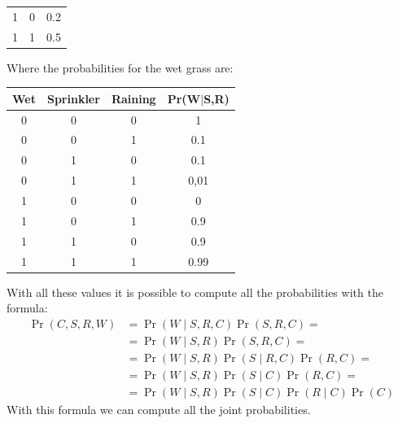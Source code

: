 \begin{example}
\begin{table}[H]
\begin{tabular}{ccc}
        1       & 0      & 0.2    \\
        1       & 1      & 0.5    \\ \hline
        \end{tabular}
    \end{table}
    Where the probabilities for the wet grass are: 
    \begin{table}[H]
        \centering
        \begin{tabular}{cccc}
        \hline
        \textbf{Wet} & \textbf{Sprinkler} & \textbf{Raining} & \textbf{Pr(W$\mid $S,R)} \\ \hline
        0            & 0                  & 0                & 1                   \\
        0            & 0                  & 1                & 0.1                 \\
        0            & 1                  & 0                & 0.1                 \\
        0            & 1                  & 1                & 0,01                \\
        1            & 0                  & 0                & 0                   \\
        1            & 0                  & 1                & 0.9                 \\
        1            & 1                  & 0                & 0.9                 \\
        1            & 1                  & 1                & 0.99                \\ \hline
        \end{tabular}
    \end{table}
    With all these values it is possible to compute all the probabilities with the formula: 
    \[
    \begin{aligned}
        \Pr(C,S,R,W)     &= \Pr(W\mid S,R,C)\Pr(S,R,C)=      \\
                                    &= \Pr(W\mid S,R)\Pr(S,R,C)=        \\
                                    &= \Pr(W\mid S,R)\Pr(S\mid R,C)\Pr(R,C)=  \\
                                    &= \Pr(W\mid S,R)\Pr(S\mid C)\Pr(R,C)=    \\
                                    &= \Pr(W\mid S,R)\Pr(S\mid C)\Pr(R\mid C)\Pr(C)
    \end{aligned}
    \]
    With this formula we can compute all the joint probabilities.

\end{example}
